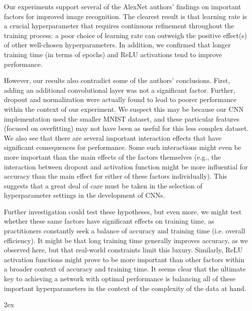 \documentclass[12pt]{article}
\begin{document}
Our experiments support several of the AlexNet authors’ findings on important factors for improved image recognition. The clearest result is that learning rate is a crucial hyperparameter that requires continuous refinement throughout the training process: a poor choice of learning rate can outweigh the positive effect(s) of other well-chosen hyperparameters. In addition, we confirmed that longer training time (in terms of epochs) and ReLU activations tend to improve performance. 

However, our results also contradict some of the authors’ conclusions. First, adding an additional convolutional layer was not a significant factor. Further, dropout and normalization were actually found to lead to poorer performance within the context of our experiment. We suspect this may be because our CNN implementation used the smaller MNIST dataset, and these particular features (focused on overfitting) may not have been as useful for this less complex dataset. We also see that there are several important interaction effects that have significant consequences for performance. Some such interactions might even be more important than the main effects of the factors themselves (e.g., the interaction between dropout and activation function might be more influential for accuracy than the main effect for either of these factors individually). This suggests that a great deal of care must be taken in the selection of hyperparameter settings in the development of CNNs.

Further investigation could test these hypotheses, but even more, we might test whether these same factors have significant effects on training time, as practitioners constantly seek a balance of accuracy and training time (i.e. overall efficiency). It might be that long training time generally improves accuracy, as we observed here, but that real-world constraints limit this luxury. Similarly, ReLU activation functions might prove to be more important than other factors within a broader context of accuracy and training time. It seems clear that the ultimate key to achieving a network with optimal performance is balancing all of these important hyperparameters in the context of the complexity of the data at hand.




\newpage
\begingroup
\parindent 0pt
\parskip 2ex
\def\enotesize{\normalsize}
\theendnotes
\endgroup
\end{document}
